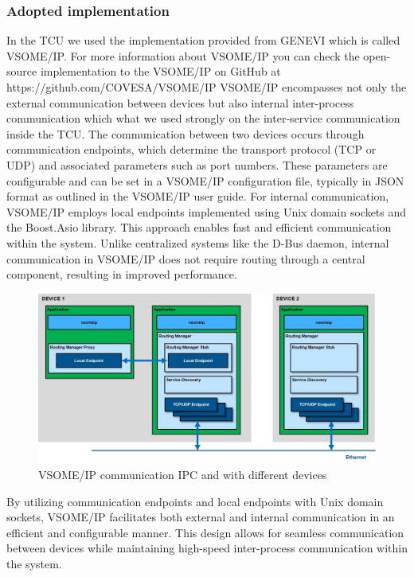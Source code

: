 \documentclass[
12pt,
oneside, 
onehalfspacing, 
nolistspacing, 
parskip, 
chapterinoneline, 
]{AASTCOMPUTER}
\begin{document}
\subsubsection{Adopted implementation}
In the TCU we used the implementation provided from GENEVI which is called VSOME/IP.
For more information about VSOME/IP you can check the open-source implementation to the VSOME/IP on GitHub at https://github.com/COVESA/VSOME/IP 
VSOME/IP encompasses not only the external communication between devices but also internal inter-process communication which what we used strongly on the inter-service communication inside the TCU.
 The communication between two devices occurs through communication endpoints, which determine the transport protocol (TCP or UDP) and associated parameters such as port numbers. These parameters are configurable and can be set in a VSOME/IP configuration file, typically in JSON format as outlined in the VSOME/IP user guide.
For internal communication, VSOME/IP employs local endpoints implemented using Unix domain sockets and the Boost.Asio library. This approach enables fast and efficient communication within the system. Unlike centralized systems like the D-Bus daemon, internal communication in VSOME/IP does not require routing through a central component, resulting in improved performance.
\begin{figure}[!ht]
\centering
\includegraphics[scale=0.3]{Figures/21.png}
\caption[VSOME/IP communication IPC and with different devices]{VSOME/IP communication IPC and with different devices}
\label{fig:TCU}
\end{figure}


By utilizing communication endpoints and local endpoints with Unix domain sockets, VSOME/IP facilitates both external and internal communication in an efficient and configurable manner. This design allows for seamless communication between devices while maintaining high-speed inter-process communication within the system.
\end{document}

